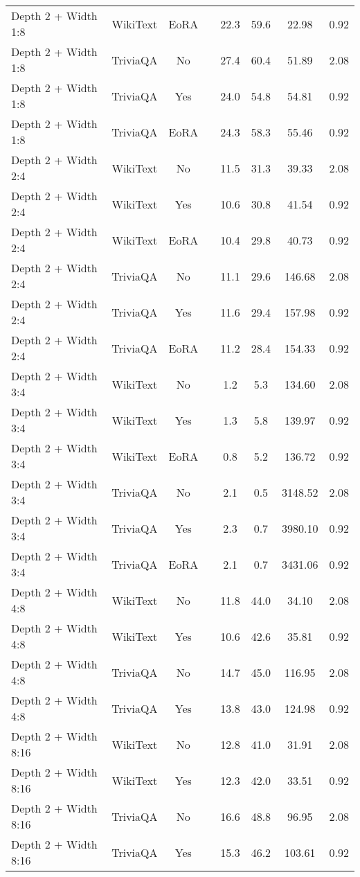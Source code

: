 \begin{longtable}{lcclcccc}
Depth 2 + Width 1:8 & WikiText & EoRA & & 22.3 & 59.6 & 22.98 & 0.92 \\
Depth 2 + Width 1:8 & TriviaQA & No & & 27.4 & 60.4 & 51.89 & 2.08 \\
Depth 2 + Width 1:8 & TriviaQA & Yes & & 24.0 & 54.8 & 54.81 & 0.92 \\
Depth 2 + Width 1:8 & TriviaQA & EoRA & & 24.3 & 58.3 & 55.46 & 0.92 \\
Depth 2 + Width 2:4 & WikiText & No & & 11.5 & 31.3 & 39.33 & 2.08 \\
Depth 2 + Width 2:4 & WikiText & Yes & & 10.6 & 30.8 & 41.54 & 0.92 \\
Depth 2 + Width 2:4 & WikiText & EoRA & & 10.4 & 29.8 & 40.73 & 0.92 \\
Depth 2 + Width 2:4 & TriviaQA & No & & 11.1 & 29.6 & 146.68 & 2.08 \\
Depth 2 + Width 2:4 & TriviaQA & Yes & & 11.6 & 29.4 & 157.98 & 0.92 \\
Depth 2 + Width 2:4 & TriviaQA & EoRA & & 11.2 & 28.4 & 154.33 & 0.92 \\
Depth 2 + Width 3:4 & WikiText & No & & 1.2 & 5.3 & 134.60 & 2.08 \\
Depth 2 + Width 3:4 & WikiText & Yes & & 1.3 & 5.8 & 139.97 & 0.92 \\
Depth 2 + Width 3:4 & WikiText & EoRA & & 0.8 & 5.2 & 136.72 & 0.92 \\
Depth 2 + Width 3:4 & TriviaQA & No & & 2.1 & 0.5 & 3148.52 & 2.08 \\
Depth 2 + Width 3:4 & TriviaQA & Yes & & 2.3 & 0.7 & 3980.10 & 0.92 \\
Depth 2 + Width 3:4 & TriviaQA & EoRA & & 2.1 & 0.7 & 3431.06 & 0.92 \\
Depth 2 + Width 4:8 & WikiText & No & & 11.8 & 44.0 & 34.10 & 2.08 \\
Depth 2 + Width 4:8 & WikiText & Yes & & 10.6 & 42.6 & 35.81 & 0.92 \\
Depth 2 + Width 4:8 & TriviaQA & No & & 14.7 & 45.0 & 116.95 & 2.08 \\
Depth 2 + Width 4:8 & TriviaQA & Yes & & 13.8 & 43.0 & 124.98 & 0.92 \\
Depth 2 + Width 8:16 & WikiText & No & & 12.8 & 41.0 & 31.91 & 2.08 \\
Depth 2 + Width 8:16 & WikiText & Yes & & 12.3 & 42.0 & 33.51 & 0.92 \\
Depth 2 + Width 8:16 & TriviaQA & No & & 16.6 & 48.8 & 96.95 & 2.08 \\
Depth 2 + Width 8:16 & TriviaQA & Yes & & 15.3 & 46.2 & 103.61 & 0.92 \\

\end{longtable}
